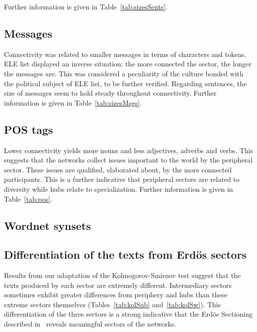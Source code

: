 \documentclass[%
 aip,
 jmp,%
 amsmath,amssymb,
 reprint,%
]{revtex4-1}
\begin{document}
Further information is given in Table~\ref{tab:sizesSents}.

\subsection{Messages}\label{subsec:mm}

Connectivity was related to smaller messages in terms of characters and tokens.
ELE list displayed an inverse situation:
the more connected the sector,
the longer the messages are.
This was considered a peculiarity of the culture bonded
with the political subject of ELE list, to be further verified.
Regarding sentences,
the size of messages seem to hold steady throughout connectivity.
Further information is given in Table~\ref{tab:sizesMsgs}.

\subsection{POS tags}\label{subsec:pos}

Lower connectivity yields more nouns and less adjectives,
adverbs and verbs.
This suggests that the networks collect issues important
to the world by the peripheral sector. 
These issues are qualified, elaborated about,
by the more connected participants.
This is a further indicative that peripheral sectors
are related to diversity while hubs relate to specialization.
Further information is given in Table~\ref{tab:pos}.

\subsection{Wordnet synsets}\label{subsec:pos}






\subsection{Differentiation of the texts from Erd\"os sectors}\label{subsec:di}
Results from our adaptation of the Kolmogorov-Smirnov test
suggest that the texts produced by each sector are extremely different.
Intermediary sectors sometimes exhibit greater differences 
from periphery and hubs than these extreme sectors themselves 
(Tables~\ref{tab:kolSub} and~\ref{tab:kolSw}).
This differentiation of the three sectors is a
strong indicative that the Erd\"os Sectioning
described in~\cite{evoSN} reveals meaningful
sectors of the networks.
\end{document}
